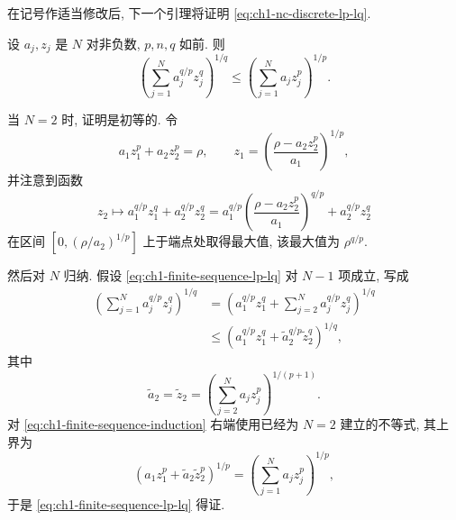 在记号作适当修改后, 下一个引理将证明 \eqref{eq:ch1-nc-discrete-lp-lq}.

\begin{Lemma}
\label{lem:ch1-finite-sequence-lp-lq}
设 $a_j,z_j$ 是 $N$ 对非负数, $p,n,q$ 如前. 则
\begin{equation}
\left(\sum_{j=1}^Na_j^{q/p}z_j^q\right)^{1/q}
\leq\left(\sum_{j=1}^Na_jz_j^p\right)^{1/p}.
\label{eq:ch1-finite-sequence-lp-lq}
\end{equation}
\end{Lemma}

\begin{Proof}
当 $N=2$ 时, 证明是初等的. 令
\[
a_1z_1^p+a_2z_2^p=\rho,
\qquad
z_1=\left(\frac{\rho-a_2z_2^p}{a_1}\right)^{1/p},
\]
并注意到函数
\[
z_2\longmapsto a_1^{q/p}z_1^q+a_2^{q/p}z_2^q
=a_1^{q/p}\left(\frac{\rho-a_2z_2^p}{a_1}\right)^{q/p}
+a_2^{q/p}z_2^q
\]
在区间 $[0,(\rho/a_2)^{1/p}]$ 上于端点处取得最大值, 该最大值为 $\rho^{q/p}$.

然后对 $N$ 归纳. 假设 \eqref{eq:ch1-finite-sequence-lp-lq} 对 $N-1$ 项成立, 写成
\begin{equation}
\begin{aligned}
\left(\sum_{j=1}^Na_j^{q/p}z_j^q\right)^{1/q}
&=\left(a_1^{q/p}z_1^q+
\sum_{j=2}^Na_j^{q/p}z_j^q\right)^{1/q}\\
&\leq\left(a_1^{q/p}z_1^q+
\widetilde a_2^{q/p}\widetilde z_2^q\right)^{1/q},
\end{aligned}
\label{eq:ch1-finite-sequence-induction}
\end{equation}
其中
\[
\widetilde a_2=\widetilde z_2
=\left(\sum_{j=2}^Na_jz_j^p\right)^{1/(p+1)}.
\]
对 \eqref{eq:ch1-finite-sequence-induction} 右端使用已经为 $N=2$ 建立的不等式, 其上界为
\[
(a_1z_1^p+\widetilde a_2\widetilde z_2^p)^{1/p}
=\left(\sum_{j=1}^Na_jz_j^p\right)^{1/p},
\]
于是 \eqref{eq:ch1-finite-sequence-lp-lq} 得证.
\end{Proof}
